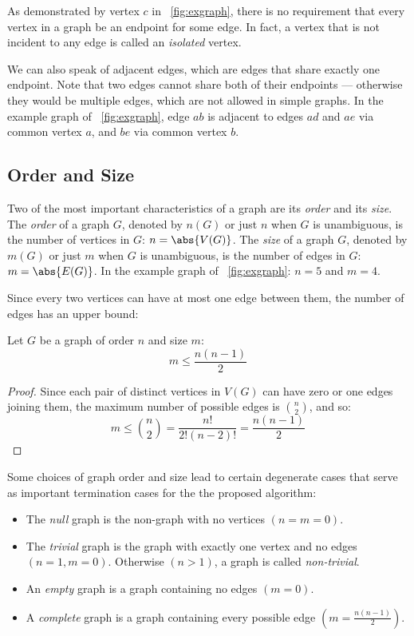 As demonstrated by vertex \(c\) in \figurename~\ref{fig:exgraph}, there is no requirement that every vertex in a
graph be an endpoint for some edge.  In fact, a vertex that is not incident to any edge is called an
\emph{isolated} vertex.

We can also speak of adjacent edges, which are edges that share exactly one endpoint.  Note that two edges cannot
share both of their endpoints --- otherwise they would be multiple edges, which are not allowed in simple graphs.
In the example graph of \figurename~\ref{fig:exgraph}, edge \(ab\) is adjacent to edges \(ad\) and \(ae\) via
common vertex \(a\), and \(be\) via common vertex \(b\).

\subsection{Order and Size}\label{sec:sub:ordersize}

Two of the most important characteristics of a graph are its \emph{order} and its \emph{size}.  The \emph{order} of
a graph \(G\), denoted by \(n(G)\) or just \(n\) when \(G\) is unambiguous, is the number of vertices in \(G\):
\(n=\abs{V(G)}\).  The \emph{size} of a graph \(G\), denoted by \(m(G)\) or just \(m\) when \(G\) is unambiguous,
is the number of edges in \(G\): \(m=\abs{E(G)}\).  In the example graph of \figurename~\ref{fig:exgraph}: \(n=5\)
and \(m=4\).

Since every two vertices can have at most one edge between them, the number of edges has an upper bound:

\begin{theorem}
  Let \(G\) be a graph of order \(n\) and size \(m\):
  \[m\le\frac{n(n-1)}{2}\]
\end{theorem}

\begin{proof}
  Since each pair of distinct vertices in \(V(G)\) can have zero or one edges joining them, the maximum number of
  possible edges is \(\binom{n}{2}\), and so:
  \[m\le\binom{n}{2}=\frac{n!}{2!(n-2)!}=\frac{n(n-1)}{2}\]
\end{proof}

Some choices of graph order and size lead to certain degenerate cases that serve as important termination cases for
the the proposed algorithm:
\begin{itemize}
\item The \emph{null} graph is the non-graph with no vertices \((n=m=0)\).
\item The \emph{trivial} graph is the graph with exactly one vertex and no edges \((n=1,m=0)\).  Otherwise
  \((n>1)\), a graph is called \emph{non-trivial}.
\item An \emph{empty} graph is a graph containing no edges \((m=0)\).
\item A \emph{complete} graph is a graph containing every possible edge \(\left(m=\frac{n(n-1)}{2}\right)\).
\end{itemize}

